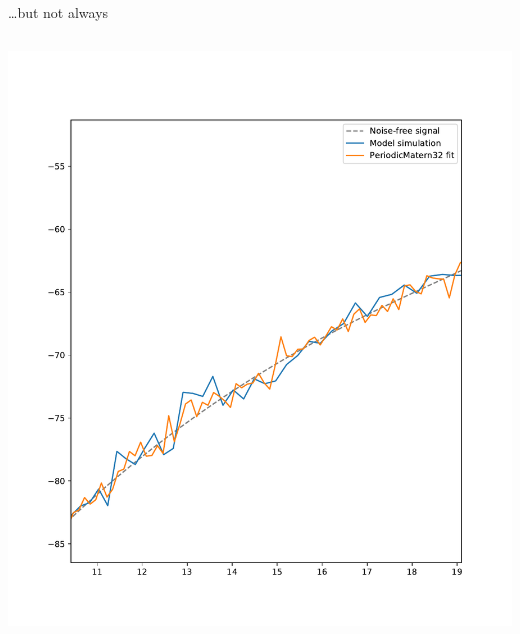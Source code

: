 \documentclass[presentation]{beamer}
\begin{document}
\begin{frame}[plain,label={sec:org0c224a2}]{\ldots{}but not always}
\begin{columns}
\begin{column}{0.5\columnwidth}
\begin{center}
\includegraphics[width=1.1\textwidth]{./Matern3.pdf}
\end{center}
\end{column}
\end{columns}
\end{frame}
\end{document}
